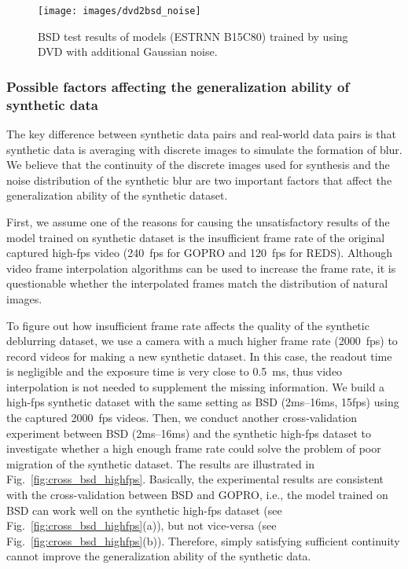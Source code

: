 \documentclass[twocolumn]{svjour3}          \smartqed  \usepackage{graphicx}
\begin{document}
\begin{figure*}[h]
	\centering
\texttt{[image: images/dvd2bsd\_noise]}
	\caption{BSD test results of models (ESTRNN B15C80) trained by using DVD with additional Gaussian noise.}
	\label{fig:dvd2bsd_noise}
\end{figure*}

\subsubsection{Possible factors affecting the generalization ability of synthetic data}
The key difference between synthetic data pairs and real-world data pairs is that synthetic data is averaging with discrete images to simulate the formation of blur. We believe that the continuity of the discrete images used for synthesis and the noise distribution of the synthetic blur are two important factors that affect the generalization ability of the synthetic dataset.

First, we assume one of the reasons for causing the unsatisfactory results of the model trained on synthetic dataset is the insufficient frame rate of the original captured high-fps video (\SI{240}{fps} for GOPRO and \SI{120}{fps} for REDS). Although video frame interpolation algorithms can be used to increase the frame rate, it is questionable whether the interpolated frames match the distribution of natural images.

To figure out how insufficient frame rate affects the quality of the synthetic deblurring dataset, we use a camera with a much higher frame rate (\SI{2000}{fps}) to record videos for making a new synthetic dataset. In this case, the readout time is negligible and the exposure time is very close to \SI{0.5}{\milli\second}, thus video interpolation is not needed to supplement the missing information. We build a high-fps synthetic dataset with the same setting as BSD (2ms--16ms, 15fps) using the captured \SI{2000}{fps} videos. Then, we conduct another cross-validation experiment between BSD (2ms--16ms) and the synthetic high-fps dataset to investigate whether a high enough frame rate could solve the problem of poor migration of the synthetic dataset. The results are illustrated in Fig.~\ref{fig:cross_bsd_highfps}. Basically, the experimental results are consistent with the cross-validation between BSD and GOPRO, i.e., the model trained on BSD can work well on the synthetic high-fps dataset (see Fig.~\ref{fig:cross_bsd_highfps}(a)), but not vice-versa (see Fig.~\ref{fig:cross_bsd_highfps}(b)). Therefore, simply satisfying sufficient continuity cannot improve the generalization ability of the synthetic data.
\end{document}
